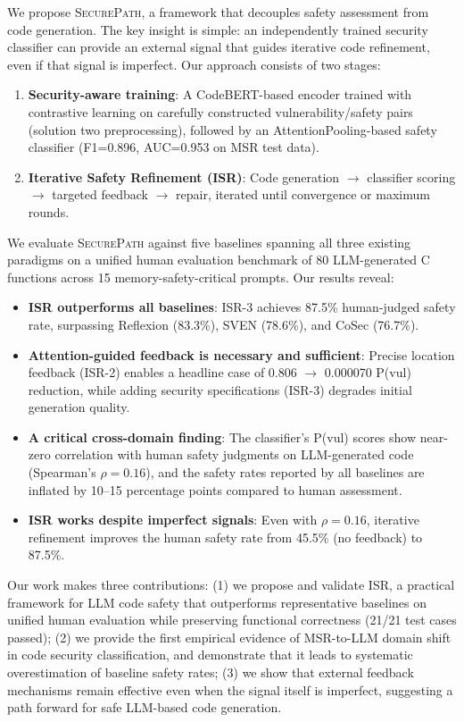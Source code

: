 \documentclass[10pt,conference]{IEEEtran}
\begin{document}
We propose \textsc{SecurePath}, a framework that decouples safety assessment from code generation. The key insight is simple: an independently trained security classifier can provide an external signal that guides iterative code refinement, even if that signal is imperfect. Our approach consists of two stages:

\begin{enumerate}
\item \textbf{Security-aware training}: A CodeBERT-based encoder trained with contrastive learning on carefully constructed vulnerability/safety pairs (solution two preprocessing), followed by an AttentionPooling-based safety classifier (F1=0.896, AUC=0.953 on MSR test data).
\item \textbf{Iterative Safety Refinement (ISR)}: Code generation $\rightarrow$ classifier scoring $\rightarrow$ targeted feedback $\rightarrow$ repair, iterated until convergence or maximum rounds.
\end{enumerate}

We evaluate \textsc{SecurePath} against five baselines spanning all three existing paradigms on a unified human evaluation benchmark of 80 LLM-generated C functions across 15 memory-safety-critical prompts. Our results reveal:

\begin{itemize}
\item \textbf{ISR outperforms all baselines}: ISR-3 achieves 87.5\% human-judged safety rate, surpassing Reflexion (83.3\%), SVEN (78.6\%), and CoSec (76.7\%).
\item \textbf{Attention-guided feedback is necessary and sufficient}: Precise location feedback (ISR-2) enables a headline case of 0.806 $\rightarrow$ 0.000070 P(vul) reduction, while adding security specifications (ISR-3) degrades initial generation quality.
\item \textbf{A critical cross-domain finding}: The classifier's P(vul) scores show near-zero correlation with human safety judgments on LLM-generated code (Spearman's $\rho=0.16$), and the safety rates reported by all baselines are inflated by 10--15 percentage points compared to human assessment.
\item \textbf{ISR works despite imperfect signals}: Even with $\rho=0.16$, iterative refinement improves the human safety rate from 45.5\% (no feedback) to 87.5\%.
\end{itemize}

Our work makes three contributions: (1) we propose and validate ISR, a practical framework for LLM code safety that outperforms representative baselines on unified human evaluation while preserving functional correctness (21/21 test cases passed); (2) we provide the first empirical evidence of MSR-to-LLM domain shift in code security classification, and demonstrate that it leads to systematic overestimation of baseline safety rates; (3) we show that external feedback mechanisms remain effective even when the signal itself is imperfect, suggesting a path forward for safe LLM-based code generation.
\end{document}
